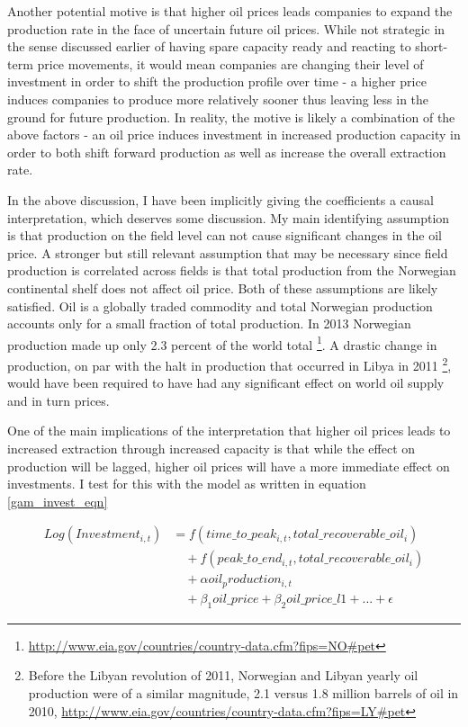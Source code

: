 \documentclass[12pt]{scrartcl} %
\begin{document}
Another potential motive is that higher oil prices leads companies to expand the production rate in the face of uncertain future oil prices.  While not strategic in the sense discussed earlier of having spare capacity ready and reacting to short-term price movements, it would mean companies are changing their level of investment in order to shift the production profile over time - a higher price induces companies to produce more relatively sooner thus leaving less in the ground for future production.  In reality, the motive is likely a combination of the above factors - an oil price induces investment in increased production capacity in order to both shift forward production as well as increase the overall extraction rate.  

In the above discussion, I have been implicitly giving the coefficients a causal interpretation, which deserves some discussion.  My main identifying assumption is that production on the field level can not cause significant changes in the oil price.  A stronger but still relevant assumption that may be necessary since field production is correlated across fields is that total production from the Norwegian continental shelf does not affect oil price.  Both of these assumptions are likely satisfied.  Oil is a globally traded commodity and total Norwegian production accounts only for a small fraction of total production.  In 2013 Norwegian production made up only 2.3 percent of the world total \footnote{\url{http://www.eia.gov/countries/country-data.cfm?fips=NO#pet}}.  A drastic change in production, on par with the halt in production that occurred in Libya in 2011 \footnote{Before the Libyan revolution of 2011, Norwegian and Libyan yearly oil production were of a similar magnitude, 2.1 versus 1.8 million barrels of oil in 2010, \url{http://www.eia.gov/countries/country-data.cfm?fips=LY#pet}}, would have been required to have had any significant effect on world oil supply and in turn prices. 

One of the main implications of the interpretation that higher oil prices leads to increased extraction through increased capacity is that while the effect on production will be lagged, higher oil prices will have a more immediate effect on investments.  I test for this with the model as written in equation \ref{gam_invest_eqn}

\begin{equation}
\begin{split}
	Log(Investment_{i,t})&=f(time\_to\_peak_{i,t}, total\_recoverable\_oil_i) \\
	& \quad + f(peak\_to\_end_{i,t}, total\_recoverable\_oil_i) \\
& \quad + \alpha oil_production_{i,t} \\
	& \quad + \beta_1 oil\_price + \beta_2 oil\_price\_l1 + ... +  \epsilon
\end{split}
\label{gam_invest_eqn}
\end{equation}
\end{document}
